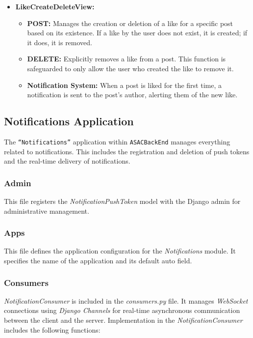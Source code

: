 \begin{itemize}
    \item \textbf{LikeCreateDeleteView:}
    \begin{itemize}
        \item \textbf{POST:} Manages the creation or deletion of a like for a specific post based on its existence. If a like by the user does not exist, it is created; if it does, it is removed.
        \item \textbf{DELETE:} Explicitly removes a like from a post. This function is safeguarded to only allow the user who created the like to remove it.
        \item \textbf{Notification System:} When a post is liked for the first time, a notification is sent to the post's author, alerting them of the new like.
    \end{itemize}
\end{itemize}

\subsection{Notifications Application}

The \texttt{``Notifications''} application within \texttt{ASACBackEnd} manages everything related to notifications. This includes the registration and deletion of push tokens and the real-time delivery of notifications.

\subsubsection{Admin} 

This file registers the \textit{NotificationPushToken} model with the Django admin for administrative management.

\subsubsection{Apps} 

This file defines the application configuration for the \textit{Notifications} module. It specifies the name of the application and its default auto field.

\subsubsection{Consumers}

\textit{NotificationConsumer} is included in the  \textit{consumers.py} file. It manages \textit{WebSocket} connections using \textit{Django Channels} for real-time asynchronous communication between the client and the server. Implementation in the \textit{NotificationConsumer} includes the following functions:

